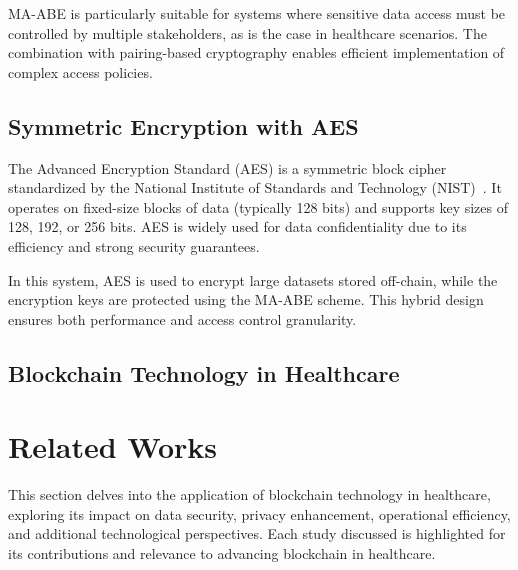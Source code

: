 \documentclass[cic,tc,english]{iiufrgs}
\begin{document}
        MA-ABE is particularly suitable for systems where sensitive data access must be controlled by multiple stakeholders, as is the case in healthcare scenarios. The combination with pairing-based cryptography enables efficient implementation of complex access policies.
        
    \section{Symmetric Encryption with AES}
        \label{sec:symmetric}
        The Advanced Encryption Standard (AES) is a symmetric block cipher standardized by the National Institute of Standards and Technology (NIST)~\citep{daemen1999aes}. It operates on fixed-size blocks of data (typically 128 bits) and supports key sizes of 128, 192, or 256 bits. AES is widely used for data confidentiality due to its efficiency and strong security guarantees.
        
        In this system, AES is used to encrypt large datasets stored off-chain, while the encryption keys are protected using the MA-ABE scheme. This hybrid design ensures both performance and access control granularity.
        
    \section{Blockchain Technology in Healthcare}
        \label{sec:blockchain}


\chapter{Related Works}
    \label{chap:relatedworks}

    This section delves into the application of blockchain technology in healthcare, exploring its impact on data security, privacy enhancement, operational efficiency, and additional technological perspectives. Each study discussed is highlighted for its contributions and relevance to advancing blockchain in healthcare.

\end{document}

